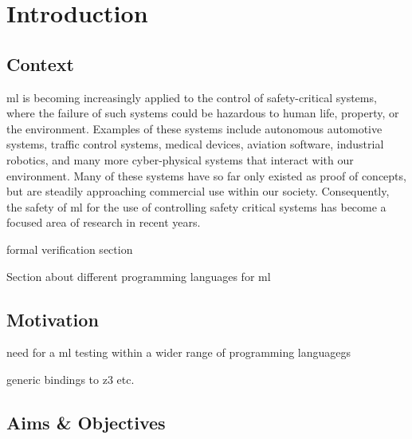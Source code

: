 
\chapter{Introduction} %
\label{Chapter1} %



\section{Context}

\Gls{ml} is becoming increasingly applied to the control of safety-critical systems, where the failure of such systems could be hazardous to human life, property, or the environment.
Examples of these systems include autonomous automotive systems, traffic control systems, medical devices, aviation software, industrial robotics, and many more cyber-physical systems that interact with our environment.
Many of these systems have so far only existed as proof of concepts, but are steadily approaching commercial use within our society.
Consequently, the safety of \gls{ml} for the use of controlling safety critical systems has become a focused area of research in recent years.

formal verification section

Section about different programming languages for ml



\section{Motivation}


need for a ml testing within a wider range of programming languagegs

generic bindings to z3 etc.


\section{Aims \& Objectives}

